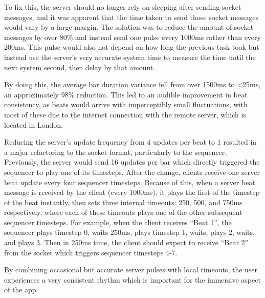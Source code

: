 To fix this, the server should no longer rely on sleeping after sending socket messages, and it was apparent that the time taken to send those socket messages would vary by a large margin. The solution was to reduce the amount of socket messages by over 80\% and instead send one pulse every 1000ms rather than every 200ms. This pulse would also not depend on how long the previous task took but instead use the server’s very accurate system time to measure the time until the next system second, then delay by that amount.

By doing this, the average bar duration variance fell from over 1500ms to <25ms, an approximately 98\% reduction. This led to an audible improvement in beat consistency, as beats would arrive with imperceptibly small fluctuations, with most of these due to the internet connection with the remote server, which is located in London.

Reducing the server’s update frequency from 4 updates per beat to 1 resulted in a major refactoring to the socket format, particularly to the sequencer. Previously, the server would send 16 updates per bar which directly triggered the sequencer to play one of its timesteps. After the change, clients receive one server beat update every four sequencer timesteps. Because of this, when a server beat message is received by the client (every 1000ms), it plays the first of the timestep of the beat instantly, then sets three internal timeouts: 250, 500, and 750ms respectively, where each of these timeouts plays one of the other subsequent sequencer timesteps. For example, when the client receives “Beat 1”, the sequencer plays timestep 0, waits 250ms, plays timestep 1, waits, plays 2, waits, and plays 3. Then in 250ms time, the client should expect to receive “Beat 2” from the socket which triggers sequencer timesteps 4-7.

By combining occasional but accurate server pulses with local timeouts, the user experiences a very consistent rhythm which is important for the immersive aspect of the app.
